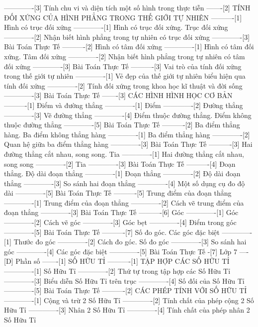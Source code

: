 -------------[3] Tính chu vi và diện tích một số hình trong thực tiễn
-------[2] TÍNH ĐỐI XỨNG CỦA HÌNH PHẲNG TRONG THẾ GIỚI TỰ NHIÊN
----------[1] Hình có trục đối xứng
-------------[1] Hình có trục đối xứng. Trục đối xứng
-------------[2] Nhận biết hình phẳng trong tự nhiên có trục đối xứng
-------------[3] Bài Toán Thực Tế
----------[2] Hình có tâm đối xứng
-------------[1] Hình có tâm đối xứng. Tâm đối xứng
-------------[2] Nhận biết hình phẳng trong tự nhiên có tâm đối xứng
-------------[3] Bài Toán Thực Tế
----------[3] Vai trò của tính đối xứng trong thế giới tự nhiên
-------------[1] Vẻ đẹp của thế giới tự nhiên biểu hiện qua tính đối xứng
-------------[2] Tính đối xứng trong khoa học kĩ thuật và đời sống
-------------[3] Bài Toán Thực Tế
-------[3] CÁC HÌNH HÌNH HỌC CƠ BẢN
----------[1] Điểm và đường thẳng
-------------[1] Điểm
-------------[2] Đường thẳng
-------------[3] Vẽ đường thẳng
-------------[4] Điểm thuộc đường thẳng. Điểm không thuộc đường thẳng
-------------[5] Bài Toán Thực Tế
----------[2] Ba điểm thẳng hàng. Ba điểm không thẳng hàng
-------------[1] Ba điểm thẳng hàng
-------------[2] Quan hệ giữa ba điểm thẳng hàng
-------------[3] Bài Toán Thực Tế
----------[3] Hai đường thẳng cắt nhau, song song. Tia
-------------[1] Hai đường thẳng cắt nhau, song song
-------------[2] Tia
-------------[3] Bài Toán Thực Tế
----------[4] Đoạn thẳng. Độ dài đoạn thẳng
-------------[1] Đoạn thẳng
-------------[2] Độ dài đoạn thẳng
-------------[3] So sánh hai đoạn thẳng
-------------[4] Một số dụng cụ đo độ dài
-------------[5] Bài Toán Thực Tế
----------[5] Trung điểm của đoạn thẳng
-------------[1] Trung điểm của đoạn thẳng
-------------[2] Cách vẽ trung điểm của đoạn thẳng
-------------[3] Bài Toán Thực Tế
----------[6] Góc
-------------[1] Góc
-------------[2] Cách vẽ góc
-------------[3] Góc bẹt
-------------[4] Điểm trong góc
-------------[5] Bài Toán Thực Tế
----------[7] Số đo góc. Các góc đặc biệt
-------------[1] Thước đo góc
-------------[2] Cách đo góc. Số đo góc
-------------[3] So sánh hai góc
-------------[4] Các góc đặc biệt
-------------[5] Bài Toán Thực Tế
-[7] Lớp 7
----[D] Phần số
-------[1] SỐ HỮU TỈ
----------[1] TẬP HỢP CÁC SỐ HỮU TỈ
-------------[1] Số Hữu Tỉ
-------------[2] Thứ tự trong tập hợp các Số Hữu Tỉ
-------------[3] Biểu diễn Số Hữu Tỉ trên trục
-------------[4] Số đối của Số Hữu Tỉ
-------------[5] Bài Toán Thực Tế
----------[2] CÁC PHÉP TÍNH VỚI SỐ HỮU TỈ
-------------[1] Cộng và trừ 2 Số Hữu Tỉ
-------------[2] Tính chất của phép cộng 2 Số Hữu Tỉ
-------------[3] Nhân 2 Số Hữu Tỉ
-------------[4] Tính chất của phép nhân 2 Số Hữu Tỉ
